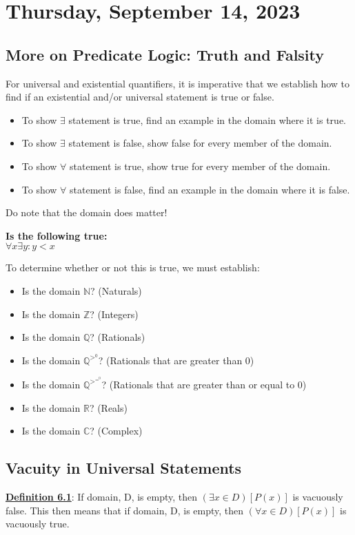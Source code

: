 \section{Thursday, September 14, 2023}
\subsection{More on Predicate Logic: Truth and Falsity}
For universal and existential quantifiers, it is imperative that we establish how to find if an existential and/or universal statement is true or false.

\begin{itemize}
    \item To show $\exists$ statement is true, find an example in the domain where it is true.
    \item To show $\exists$ statement is false, show false for every member of the domain.
    \item To show $\forall$ statement is true, show true for every member of the domain.
    \item To show $\forall$ statement is false, find an example in the domain where it is false.
\end{itemize}

Do note that the domain does matter!

\begin{example}
\textbf{Is the following true:}\\
$\forall x \exists y: y<x$
\end{example}

To determine whether or not this is true, we must establish:
\begin{itemize}
    \item Is the domain $\mathbb{N}$? (Naturals)
    \item Is the domain $\mathbb{Z}$? (Integers)
    \item Is the domain $\mathbb{Q}$? (Rationals)
    \item Is the domain $\mathbb{Q}^>^0$? (Rationals that are greater than 0)
    \item Is the domain $\mathbb{Q}^>^=^0$? (Rationals that are greater than or equal to 0)
    \item Is the domain $\mathbb{R}$? (Reals)
    \item Is the domain $\mathbb{C}$? (Complex)
\end{itemize}

\subsection{Vacuity in Universal Statements}
\textbf{\underline{Definition 6.1}}: If domain, D, is empty, then $(\exists x \in D)[P(x)]$ is vacuously false. This then means that if domain, D, is empty, then $(\forall x \in D)[P(x)]$ is vacuously true.


